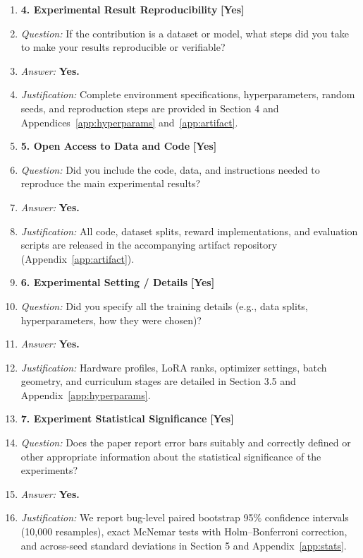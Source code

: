 \documentclass{article}
\begin{document}
\begin{enumerate}
\item[] \textbf{4. Experimental Result Reproducibility} \hfill \textbf{[Yes]}
\item[] \textit{Question:} If the contribution is a dataset or model, what steps did you take to make your results reproducible or verifiable?
\item[] \textit{Answer:} \textbf{Yes.}
\item[] \textit{Justification:} Complete environment specifications, hyperparameters, random seeds, and reproduction steps are provided in Section 4 and Appendices~\ref{app:hyperparams} and~\ref{app:artifact}.

\item[] \textbf{5. Open Access to Data and Code} \hfill \textbf{[Yes]}
\item[] \textit{Question:} Did you include the code, data, and instructions needed to reproduce the main experimental results?
\item[] \textit{Answer:} \textbf{Yes.}
\item[] \textit{Justification:} All code, dataset splits, reward implementations, and evaluation scripts are released in the accompanying artifact repository (Appendix~\ref{app:artifact}).

\item[] \textbf{6. Experimental Setting / Details} \hfill \textbf{[Yes]}
\item[] \textit{Question:} Did you specify all the training details (e.g., data splits, hyperparameters, how they were chosen)?
\item[] \textit{Answer:} \textbf{Yes.}
\item[] \textit{Justification:} Hardware profiles, LoRA ranks, optimizer settings, batch geometry, and curriculum stages are detailed in Section 3.5 and Appendix~\ref{app:hyperparams}.

\item[] \textbf{7. Experiment Statistical Significance} \hfill \textbf{[Yes]}
\item[] \textit{Question:} Does the paper report error bars suitably and correctly defined or other appropriate information about the statistical significance of the experiments?
\item[] \textit{Answer:} \textbf{Yes.}
\item[] \textit{Justification:} We report bug-level paired bootstrap 95\% confidence intervals (10,000 resamples), exact McNemar tests with Holm--Bonferroni correction, and across-seed standard deviations in Section 5 and Appendix~\ref{app:stats}.


\end{enumerate}
\end{document}
